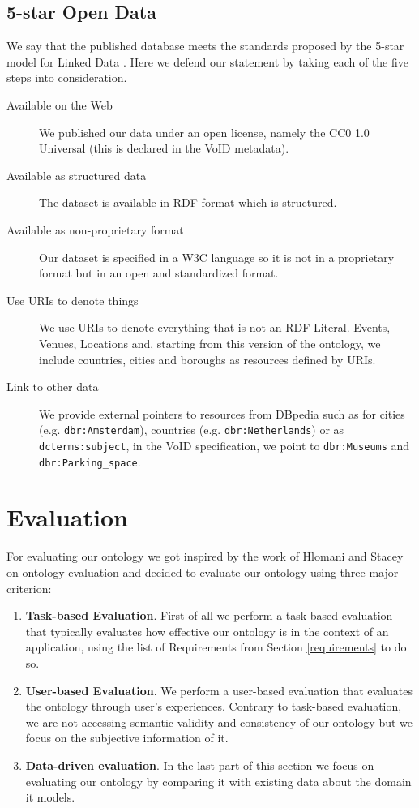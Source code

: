 \documentclass[runningheads,a4paper]{../../StyleFiles/llncs}
\begin{document}
\subsection{5-star Open Data}
We say that the published database meets the standards proposed by the 5-star model for Linked Data \cite{janowicz2014five}. Here we defend our statement by taking each of the five steps into consideration.

\begin{description}
\item[Available on the Web] We published our data under an open license, namely the CC0 1.0 Universal (this is declared in the VoID metadata).
\item[Available as structured data] The dataset is available in RDF format which is structured.
\item[Available as non-proprietary format] Our dataset is specified in a W3C language so it is not in a proprietary format but in an open and standardized format.
\item[Use URIs to denote things] We use URIs to denote everything that is not an RDF Literal. Events, Venues, Locations and, starting from this version of the ontology, we include countries, cities and boroughs as resources defined by URIs.
\item[Link to other data] We provide external pointers to resources from DBpedia such as for cities (e.g. \texttt{dbr:Amsterdam}), countries (e.g. \texttt{dbr:Netherlands}) or as \texttt{dcterms:subject}, in the VoID
specification, we point to \texttt{dbr:Museums} and \texttt{dbr:Parking\_space}.
\end{description}


\section{Evaluation}
For evaluating our ontology we got inspired by the work of Hlomani and Stacey \cite{hlomani2014approaches} on ontology evaluation and decided to evaluate our ontology using three major criterion:
\begin{enumerate}
	\item \textbf{Task-based Evaluation}. First of all we perform a task-based evaluation that typically evaluates how effective our ontology is in the context of an application, using the list of Requirements from Section \ref{requirements} to do so. 
	\item \textbf{User-based Evaluation}. We perform a user-based evaluation that evaluates the ontology through user's experiences. Contrary to task-based evaluation, we are not accessing semantic validity and consistency of our ontology but we focus on the subjective information of it.
	\item \textbf{Data-driven evaluation}. In the last part of this section we focus on evaluating our ontology by comparing it with existing data about the domain it models.
\end{enumerate} 
\end{document}
